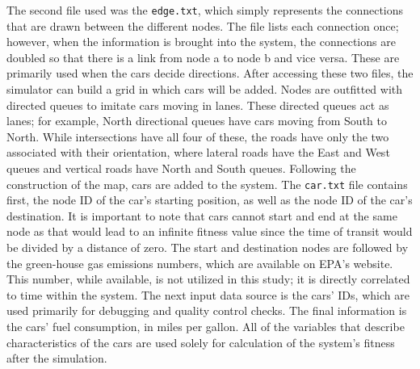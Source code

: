 The second file used was the \texttt{edge.txt}, which simply represents the connections that are drawn between the different nodes.  The file lists each connection once; however, when the information is brought into the system, the connections are doubled so that there is a link from node a to node b and vice versa.  These are primarily used when the cars decide directions.  After accessing these two files, the simulator can build a grid in which cars will be added.  Nodes are outfitted with directed queues to imitate cars moving in lanes.  These directed queues act as lanes; for example, North directional queues have cars moving from South to North.  While intersections have all four of these, the roads have only the two associated with their orientation, where lateral roads have the East and West queues and vertical roads have North and South queues.  Following the construction of the map, cars are added to the system.  The \texttt{car.txt} file contains first, the node ID of the car's starting position, as well as the node ID of the car's destination.  It is important to note that cars cannot start and end at the same node as that would lead to an infinite fitness value since the time of transit would be divided by a distance of zero.  The start and destination nodes are followed by the green-house gas emissions numbers, which are available on EPA's website.  This number, while available, is not utilized in this study; it is directly correlated to time within the system.  The next input data source is the cars' IDs, which are used primarily for debugging and quality control checks.  The final information is the cars' fuel consumption, in miles per gallon.  All of the variables that describe characteristics of the cars are used solely for calculation of the system's fitness after the simulation.

